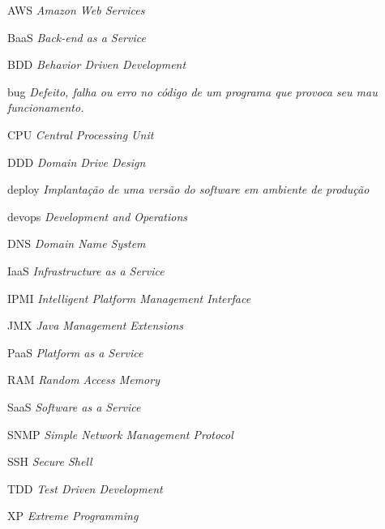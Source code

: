 \documentclass[
	12pt,				%
	openright,			%
	oneside,			%
	a4paper,			%
	english,			%
	french,				%
	spanish,			%
	brazil,				%
	]{abntex2}
\begin{document}
\begin{siglas}
	\item[AWS] \textit{Amazon Web Services}
	\item[BaaS] \textit{Back-end as a Service}
	\item[BDD] \textit{Behavior Driven Development}
	\item[bug] \textit{Defeito, falha ou erro no código de um programa que provoca seu mau funcionamento.}
	\item[CPU] \textit{Central Processing Unit}
	\item[DDD] \textit{Domain Drive Design}
	\item[deploy] \textit{Implantação de uma versão do software em ambiente de produção}
	\item[devops] \textit{Development and Operations}
	\item[DNS] \textit{Domain Name System}
	\item[IaaS] \textit{Infrastructure as a Service}
	\item[IPMI] \textit{Intelligent Platform Management Interface}
	\item[JMX] \textit{Java Management Extensions}
	\item[PaaS] \textit{Platform as a Service}
	\item[RAM] \textit{Random Access Memory}
	\item[SaaS] \textit{Software as a Service}
	\item[SNMP] \textit{Simple Network Management Protocol}
	\item[SSH] \textit{Secure Shell}
	\item[TDD] \textit{Test Driven Development}
	\item[XP] \textit{Extreme Programming}
\end{siglas}


\tableofcontents*
\cleardoublepage


\textual
\end{document}

